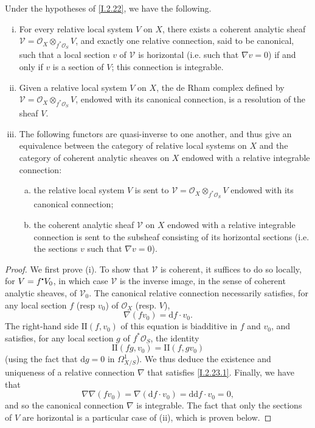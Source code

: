 \documentclass{report}
\theoremstyle{plain}
\newenvironment{theorem}[1]
    {\renewcommand\theinnercustomtheorem{#1}\innercustomtheorem}
    {\endinnercustomlemma}
\theoremstyle{definition}
\newcommand{\sh}{\mathscr}
\newcommand{\sbullet}{{\mathbin{\vcenter{\hbox{\scalebox{.5}{$\bullet$}}}}}}
\newcommand{\dd}{\mathrm{d}}
\newcommand{\II}{\mathrm{II}}
\newcommand{\oldpage}[1]{\marginpar{\footnotesize$\Big\vert$ \textit{p.~#1}}}
\begin{document}
\begin{theorem}{2.23}
\label{I.2.23}
  Under the hypotheses of \cref{I.2.22}, we have the following.
  \begin{enumerate}[(i)]
    \item For every relative local system $V$ on $X$, there exists a coherent analytic sheaf \mbox{$\sh{V}=\sh{O}_X\otimes_{f^*\sh{O}_S}V$}, and exactly one relative connection, said to be canonical, such that a local section $v$ of $\sh{V}$ is horizontal (i.e. such that $\nabla v=0$) if and only if $v$ is a section of $V$;
      this connection is integrable.
    \item Given a relative local system $V$ on $X$, the de Rham complex defined
\oldpage{15}
      by $\sh{V}=\sh{O}_X\otimes_{f^*\sh{O}_S}V$, endowed with its canonical connection, is a resolution of the sheaf $V$.
    \item The following functors are quasi-inverse to one another, and thus give an equivalence between the category of relative local systems on $X$ and the category of coherent analytic sheaves on $X$ endowed with a relative integrable connection:
      \begin{enumerate}[a)]
        \item the relative local system $V$ is sent to $\sh{V}=\sh{O}_X\otimes_{f^*\sh{O}_S}V$ endowed with its canonical connection;
        \item the coherent analytic sheaf $\sh{V}$ on $X$ endowed with a relative integrable connection is sent to the subsheaf consisting of its horizontal sections (i.e. the sections $v$ such that $\nabla v=0$).
      \end{enumerate}
  \end{enumerate}
\end{theorem}

\begin{proof}
  We first prove (i).
  To show that $\sh{V}$ is coherent, it suffices to do so locally, for $V=f^\sbullet V_0$, in which case $\sh{V}$ is the inverse image, in the sense of coherent analytic sheaves, of $\sh{V}_0$.
  The canonical relative connection necessarily satisfies, for any local section $f$ (resp $v_0$) of $\sh{O}_X$ (resp. $V$),
  \[
  \label{I.2.23.1}
    \nabla(fv_0) = \dd f\cdot v_0.
  \tag{2.23.1}
  \]
  The right-hand side $\II(f,v_0)$ of this equation is biadditive in $f$ and $v_0$, and satisfies, for any local section $g$ of $f^*\sh{O}_S$, the identity
  \[
    \II(fg,v_0) = \II(f,gv_0)
  \]
  (using the fact that $\dd g=0$ in $\Omega_{X/S}^1$).
  We thus deduce the existence and uniqueness of a relative connection $\nabla$ that satisfies \cref{I.2.23.1}.
  Finally, we have that
  \[
    \nabla\nabla(fv_0) = \nabla(\dd f\cdot v_0) = \dd\dd f\cdot v_0 = 0,
  \]
  and so the canonical connection $\nabla$ is integrable.
  The fact that only the sections of $V$ are horizontal is a particular case of (ii), which is proven below.
\end{proof}
\end{document}
